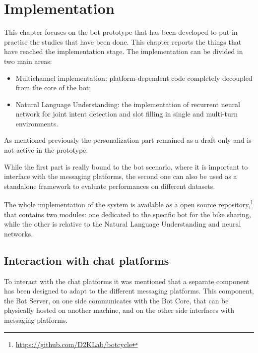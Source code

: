 
\chapter{Implementation}
\label{implementation}

This chapter focuses on the bot prototype that has been developed to put in practise the studies that have been done. This chapter reports the things that have reached the implementation stage. The implementation can be divided in two main areas:

\begin{itemize}
	\item Multichannel implementation: platform-dependent code completely decoupled from the core of the bot;

	\item Natural Language Understanding: the implementation of recurrent neural network for joint intent detection and slot filling in single and multi-turn environments.
\end{itemize}

As mentioned previously the personalization part remained as a draft only and is not active in the prototype.

While the first part is really bound to the bot scenario, where it is important to interface with the messaging platforms, the second one can also be used as a standalone framework to evaluate performances on different datasets.

The whole implementation of the system is available as a open source repository,\footnote{\url{https://github.com/D2KLab/botcycle}} that contains two modules: one dedicated to the specific bot for the bike sharing, while the other is relative to the Natural Language Understanding and neural networks.

\section{Interaction with chat platforms}
\label{implementationInteraction}

To interact with the chat platforms it was mentioned that a separate component has been designed to adapt to the different messaging platforms. This component, the Bot Server, on one side communicates with the Bot Core, that can be physically hosted on another machine, and on the other side interfaces with messaging platforms.

